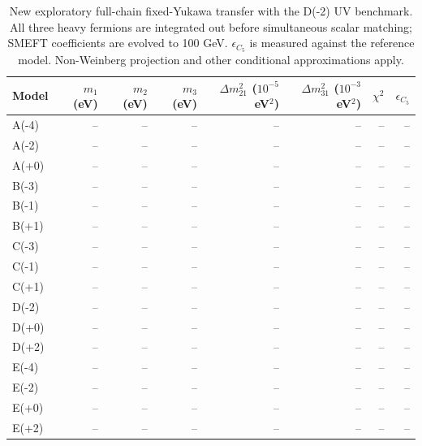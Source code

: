 \begin{table}[htbp]
\centering
\small
\setlength{\tabcolsep}{3.4pt}
\begin{tabular}{lrrrrrrr}
\hline
Model & $m_1$ (eV) & $m_2$ (eV) & $m_3$ (eV) & $\Delta m^2_{21}$ ($10^{-5}$ eV$^2$) & $\Delta m^2_{31}$ ($10^{-3}$ eV$^2$) & $\chi^2$ & $\epsilon_{C_5}$ \\
\hline
A(-4) & -- & -- & -- & -- & -- & -- & -- \\
A(-2) & -- & -- & -- & -- & -- & -- & -- \\
A(+0) & -- & -- & -- & -- & -- & -- & -- \\
B(-3) & -- & -- & -- & -- & -- & -- & -- \\
B(-1) & -- & -- & -- & -- & -- & -- & -- \\
B(+1) & -- & -- & -- & -- & -- & -- & -- \\
C(-3) & -- & -- & -- & -- & -- & -- & -- \\
C(-1) & -- & -- & -- & -- & -- & -- & -- \\
C(+1) & -- & -- & -- & -- & -- & -- & -- \\
D(-2) & -- & -- & -- & -- & -- & -- & -- \\
D(+0) & -- & -- & -- & -- & -- & -- & -- \\
D(+2) & -- & -- & -- & -- & -- & -- & -- \\
E(-4) & -- & -- & -- & -- & -- & -- & -- \\
E(-2) & -- & -- & -- & -- & -- & -- & -- \\
E(+0) & -- & -- & -- & -- & -- & -- & -- \\
E(+2) & -- & -- & -- & -- & -- & -- & -- \\
\hline
\end{tabular}
\caption{New exploratory full-chain fixed-Yukawa transfer with the D(-2) UV benchmark. All three heavy fermions are integrated out before simultaneous scalar matching; SMEFT coefficients are evolved to 100 GeV. $\epsilon_{C_5}$ is measured against the reference model. Non-Weinberg projection and other conditional approximations apply.}
\label{tab:generalised_b1}
\end{table}
